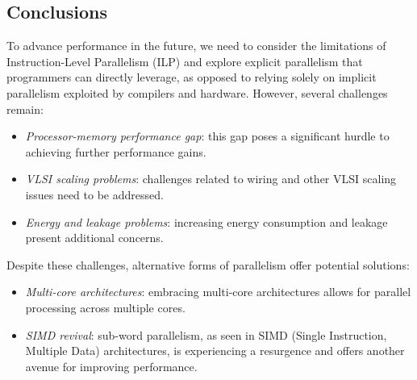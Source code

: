 \subsection{Conclusions}
To advance performance in the future, we need to consider the limitations of Instruction-Level Parallelism (ILP) and explore explicit parallelism that programmers can directly leverage, as opposed to relying solely on implicit parallelism exploited by compilers and hardware.
However, several challenges remain:
\begin{itemize}
    \item \textit{Processor-memory performance gap}: this gap poses a significant hurdle to achieving further performance gains.
    \item \textit{VLSI scaling problems}: challenges related to wiring and other VLSI scaling issues need to be addressed.
    \item \textit{Energy and leakage problems}: increasing energy consumption and leakage present additional concerns.
\end{itemize}
Despite these challenges, alternative forms of parallelism offer potential solutions:
\begin{itemize}
    \item \textit{Multi-core architectures}: embracing multi-core architectures allows for parallel processing across multiple cores.
    \item \textit{SIMD revival}: sub-word parallelism, as seen in SIMD (Single Instruction, Multiple Data) architectures, is experiencing a resurgence and offers another avenue for improving performance.
\end{itemize}